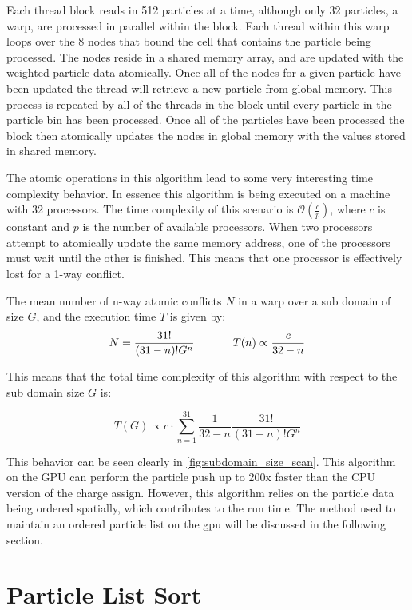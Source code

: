 Each thread block reads in 512 particles at a time, although only 32 particles, a warp, are processed in parallel within the block. Each thread within this warp loops over the 8 nodes that bound the cell that contains the particle being processed. The nodes reside in a shared memory array, and are updated with the weighted particle data atomically. Once all of the nodes for a given particle have been updated the thread will retrieve a new particle from global memory. This process is repeated by all of the threads in the block until every particle in the particle bin has been processed. Once all of the particles have been processed the block then atomically updates the nodes in global memory with the values stored in shared memory.  

The atomic operations in this algorithm lead to some very interesting time complexity behavior. In essence this algorithm is being executed on a machine with 32 processors. The time complexity of this scenario is $\mathcal{O}(\frac{c}{p})$, where $c$ is constant and $p$ is the number of available processors. When two processors attempt to atomically update the same memory address, one of the processors must wait until the other is finished. This means that one processor is effectively lost for a 1-way conflict. 

The mean number of n-way atomic conflicts $N$ in a warp over a sub domain of size $G$, and the execution time $T$ is given by:
\begin{equation}
N = \frac{31!}{(31-n)! G^n} \hspace{0.1\textwidth} T(n) \propto \frac{c}{32-n}
\end{equation}

This means that the total time complexity of this algorithm with respect to the sub domain size $G$ is:

\begin{equation}
T(G) \propto c \cdot \sum_{n=1}^{31} \frac{1}{32-n} \frac{31!}{(31-n)! G^n}
\end{equation}

This behavior can be seen clearly in \ref{fig:subdomain_size_scan}. This algorithm on the GPU can perform the particle push up to 200x faster than the CPU version of the charge assign. However, this algorithm relies on the particle data being ordered spatially, which contributes to the run time. The method used to maintain an ordered particle list on the gpu will be discussed in the following section.


	\section{Particle List Sort}
	\label{sec:plist_sort}
	
